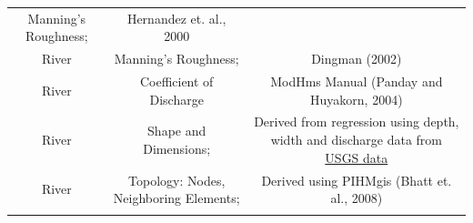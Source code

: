 \documentclass[]{scrbook}
\begin{document}
\begin{longtable}[]{@{}ccc@{}}
\begin{minipage}[t]{0.24\columnwidth}
Manning's Roughness;\strut
\end{minipage} & \begin{minipage}[t]{0.43\columnwidth}\centering\strut
Hernandez et. al., 2000\strut
\end{minipage}\tabularnewline
\begin{minipage}[t]{0.18\columnwidth}\centering\strut
River\strut
\end{minipage} & \begin{minipage}[t]{0.24\columnwidth}\centering\strut
Manning's Roughness;\strut
\end{minipage} & \begin{minipage}[t]{0.43\columnwidth}\centering\strut
Dingman (2002)\strut
\end{minipage}\tabularnewline
\begin{minipage}[t]{0.18\columnwidth}\centering\strut
River\strut
\end{minipage} & \begin{minipage}[t]{0.24\columnwidth}\centering\strut
Coefficient of Discharge\strut
\end{minipage} & \begin{minipage}[t]{0.43\columnwidth}\centering\strut
ModHms Manual (Panday and Huyakorn, 2004)\strut
\end{minipage}\tabularnewline
\begin{minipage}[t]{0.18\columnwidth}\centering\strut
River\strut
\end{minipage} & \begin{minipage}[t]{0.24\columnwidth}\centering\strut
Shape and Dimensions;\strut
\end{minipage} & \begin{minipage}[t]{0.43\columnwidth}\centering\strut
Derived from regression using depth, width and discharge data from
\href{http://nwis.waterdata.usgs.gov/usa/nwis/measurements}{USGS
data}\strut
\end{minipage}\tabularnewline
\begin{minipage}[t]{0.18\columnwidth}\centering\strut
River\strut
\end{minipage} & \begin{minipage}[t]{0.24\columnwidth}\centering\strut
Topology: Nodes, Neighboring Elements;\strut
\end{minipage} & \begin{minipage}[t]{0.43\columnwidth}\centering\strut
Derived using PIHMgis (Bhatt et. al., 2008)\strut
\end{minipage}\tabularnewline
\begin{minipage}[t]{0.18\columnwidth}\centering\strut

\end{minipage}
\end{longtable}
\end{document}

